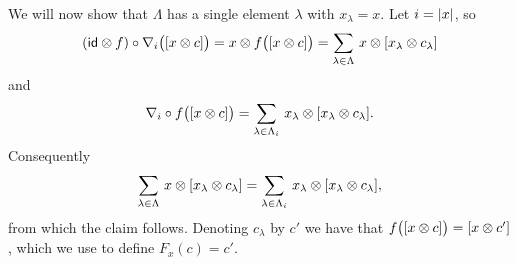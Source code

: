 We will now show that $\Lambda$ has a single element $\lambda$ with $x_\lambda = x$.
Let $i = \lvert x\rvert$, so
\begin{equation*} %
	(\id \ot f) \circ \nabla_i \big( [x \ot c] \big) =
	x \ot f \big( [x \ot c] \big) =
	\sum_{\lambda \in \Lambda} \, x \ot [x_\lambda \ot c_\lambda]
\end{equation*}
and
\begin{equation*} %
	\nabla_i \circ f \big( [x \ot c] \big) =
	\sum_{\lambda \in \Lambda_i} \, x_\lambda \ot [x_\lambda \ot c_\lambda].
\end{equation*}
Consequently
\[
\sum_{\lambda \in \Lambda} \, x \otimes [x_\lambda \otimes c_\lambda] =
\sum_{\lambda \in \Lambda_i} \, x_\lambda \otimes [x_\lambda \otimes c_\lambda],
\]
from which the claim follows.
Denoting $c_\lambda$ by $c'$ we have that $f \big( [x \otimes c] \big) = [x \otimes c']$, which we use to define $F_x(c) = c'$.

